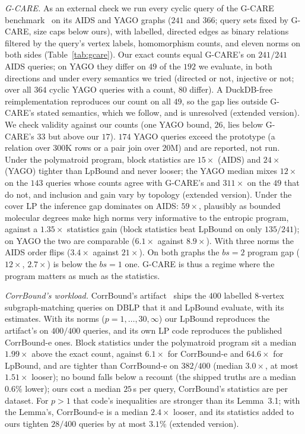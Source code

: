 \documentclass[conference]{IEEEtran}
\begin{document}
\emph{G-CARE.} As an external check we run every cyclic query of the
G-CARE benchmark~\cite{park2020gcare} on its AIDS and YAGO graphs ($241$
and $366$; query sets fixed by G-CARE, size caps below ours), with
labelled, directed edges as binary relations filtered by the query's
vertex labels, homomorphism counts, and eleven norms on both sides
(Table~\ref{tab:gcare}). Our exact counts equal G-CARE's on $241/241$ AIDS
queries; on YAGO they differ on $49$ of the $192$ we evaluate, in both
directions and under every semantics we tried (directed or not, injective
or not; over all $364$ cyclic YAGO queries with a count, $80$ differ). A DuckDB-free reimplementation reproduces our count on all $49$, so the gap lies outside G-CARE's stated semantics, which we follow, and is unresolved (extended version). We check validity against our counts (one YAGO bound, $26$, lies
below G-CARE's $33$ but above our $17$). $174$ YAGO queries exceed the
prototype (a relation over $300$K rows or a pair join over $20$M) and are
reported, not run. Under the polymatroid program, block statistics are
$15\times$ (AIDS) and $24\times$ (YAGO) tighter than LpBound and never looser; the YAGO median mixes $12\times$ on the $143$ queries whose counts agree with G-CARE's and $311\times$ on the $49$ that do not, and inclusion and gain vary by topology (extended version). Under
the cover LP the inference gap dominates on AIDS: $59\times$, plausibly as bounded
molecular degrees make high norms very informative to the entropic
program, against a $1.35\times$ statistics gain (block statistics beat
LpBound on only $135/241$); on YAGO the two are comparable ($6.1\times$
against $8.9\times$). With three norms the AIDS order flips ($3.4\times$ against $21\times$). On both
graphs the $bs{=}2$ program gap ($12\times$, $2.7\times$) is below the
$bs{=}1$ one. G-CARE is thus a regime where the program matters as much as the statistics.

\emph{CorrBound's workload.} CorrBound's artifact~\cite{mayer2026corrbound}
ships the $400$ labelled $8$-vertex subgraph-matching queries on DBLP that it and LpBound evaluate, with
its estimates. With its norms ($p{=}1,\dots,30,\infty$) our LpBound
reproduces the artifact's on $400/400$ queries, and its own LP code reproduces the published CorrBound-e ones. Block statistics under the
polymatroid program sit a median $1.99\times$ above the exact count,
against $6.1\times$ for CorrBound-e and $64.6\times$ for LpBound, and are
tighter than CorrBound-e on $382/400$ (median $3.0\times$, at most
$1.51\times$ looser); no bound falls below a recount (the shipped truths are a median $0.6\%$ lower); ours cost a median $25$\,s per query, CorrBound's statistics are per dataset. For $p{>}1$ that code's inequalities are stronger than its Lemma~3.1; with the Lemma's, CorrBound-e is a median $2.4\times$ looser, and its statistics added to ours tighten $28/400$ queries by at most $3.1\%$ (extended version).
\end{document}
